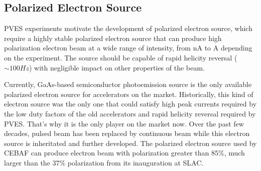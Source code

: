 \subsection{Polarized Electron Source}
PVES experiments motivate the development of polarized electron source, which 
require a highly stable polarized electron source that can produce
high polarization electron beam at a wide range of intensity, from nA to A 
depending on the experiment. The source should be capable of rapid helicity
reversal ($\sim 100 Hz$) with negligible impact on other properties of the beam.

Currently, GaAs-based semiconductor photoemission source is %
the only available polarized electron source for accelerators on the market.
Historically, this 
kind of electron source was the only one that could satisfy high peak currents 
required by the low duty factors of the old accelerators and rapid helicity 
reversal required by PVES. That's why it is the only player on the market now.
Over the past few decades, pulsed beam has been replaced by continuous beam while
this electron source is inheritated and further developed. The polarized electron
source used by CEBAF can produce electron beam with polarization greater than
85\%, much larger than the 37\% polarization from its inauguration at SLAC. \cite{PRESCOTT1978347}

